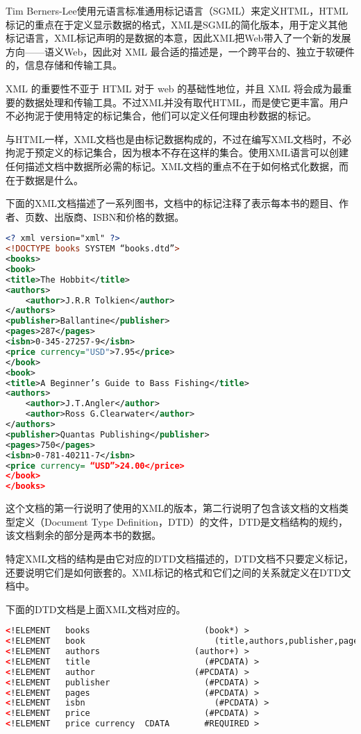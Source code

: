 Tim Berners-Lee使用元语言标准通用标记语言（SGML）来定义HTML，HTML标记的重点在于定义显示数据的格式，XML是SGML的简化版本，用于定义其他标记语言，XML标记声明的是数据的本意，因此XML把Web带入了一个新的发展方向——语义Web，因此对 XML 最合适的描述是，一个跨平台的、独立于软硬件的，信息存储和传输工具。

 XML 的重要性不亚于 HTML 对于 web 的基础性地位，并且 XML 将会成为最重要的数据处理和传输工具。不过XML并没有取代HTML，而是使它更丰富。用户不必拘泥于使用特定的标记集合，他们可以定义任何理由秒数据的标记。

与HTML一样，XML文档也是由标记数据构成的，不过在编写XML文档时，不必拘泥于预定义的标记集合，因为根本不存在这样的集合。使用XML语言可以创建任何描述文档中数据所必需的标记。XML文档的重点不在于如何格式化数据，而在于数据是什么。

下面的XML文档描述了一系列图书，文档中的标记注释了表示每本书的题目、作者、页数、出版商、ISBN和价格的数据。



\begin{lstlisting}[language=XML]
<? xml version="xml" ?>
<!DOCTYPE books SYSTEM “books.dtd”>
<books>
<book>
<title>The Hobbit</title>
<authors>
	<author>J.R.R Tolkien</author>
</authors>
<publisher>Ballantine</publisher>
<pages>287</pages>
<isbn>0-345-27257-9</isbn>
<price currency="USD">7.95</price>
</book>
<book>
<title>A Beginner’s Guide to Bass Fishing</title>
<authors>
	<author>J.T.Angler</author>
	<author>Ross G.Clearwater</author>
</authors>
<publisher>Quantas Publishing</publisher>
<pages>750</pages>
<isbn>0-781-40211-7</isbn>
<price currency= “USD”>24.00</price>
</book>
</books>
\end{lstlisting}

这个文档的第一行说明了使用的XML的版本，第二行说明了包含该文档的文档类型定义（Document Type Definition，DTD）的文件，DTD是文档结构的规约，该文档剩余的部分是两本书的数据。

特定XML文档的结构是由它对应的DTD文档描述的，DTD文档不只要定义标记，还要说明它们是如何嵌套的。XML标记的格式和它们之间的关系就定义在DTD文档中。

下面的DTD文档是上面XML文档对应的。

\begin{lstlisting}[language=XML]
<!ELEMENT	books					    (book*) >
<!ELEMENT	book						  (title,authors,publisher,pages,isbn,price) >
<!ELEMENT	authors					  (author+) >
<!ELEMENT	title					  	(#PCDATA) >
<!ELEMENT	author					  (#PCDATA) >
<!ELEMENT	publisher					(#PCDATA) >
<!ELEMENT	pages					    (#PCDATA) >
<!ELEMENT	isbn						  (#PCDATA) >
<!ELEMENT	price					    (#PCDATA) >
<!ELEMENT	price currency	CDATA		#REQUIRED >
\end{lstlisting}

